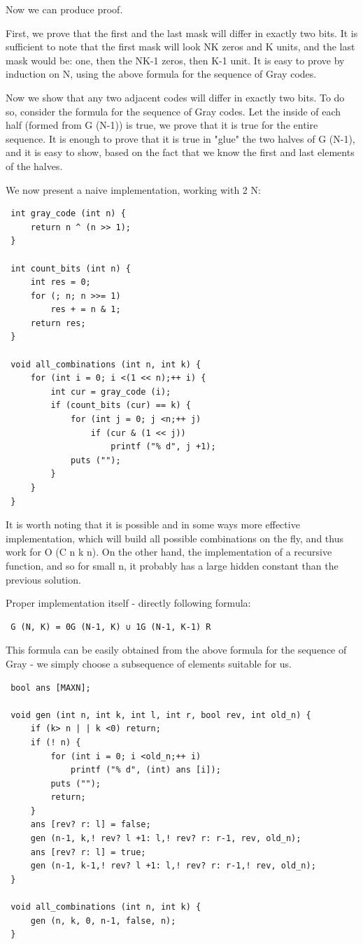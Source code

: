 Now we can produce proof.

First, we prove that the first and the last mask will differ in exactly two bits. It is sufficient to note that the first mask will look NK zeros and K units, and the last mask would be: one, then the NK-1 zeros, then K-1 unit. It is easy to prove by induction on N, using the above formula for the sequence of Gray codes.

Now we show that any two adjacent codes will differ in exactly two bits. To do so, consider the formula for the sequence of Gray codes. Let the inside of each half (formed from G (N-1)) is true, we prove that it is true for the entire sequence. It is enough to prove that it is true in "glue" the two halves of G (N-1), and it is easy to show, based on the fact that we know the first and last elements of the halves.

We now present a naive implementation, working with 2 N:

\begin{verbatim}
 int gray_code (int n) {
     return n ^ (n >> 1);
 }

 int count_bits (int n) {
     int res = 0;
     for (; n; n >>= 1)
         res + = n & 1;
     return res;
 }

 void all_combinations (int n, int k) {
     for (int i = 0; i <(1 << n);++ i) {
         int cur = gray_code (i);
         if (count_bits (cur) == k) {
             for (int j = 0; j <n;++ j)
                 if (cur & (1 << j))
                     printf ("% d", j +1);
             puts ("");
         }
     }
 } 
\end{verbatim}
It is worth noting that it is possible and in some ways more effective implementation, which will build all possible combinations on the fly, and thus work for O (C n k n). On the other hand, the implementation of a recursive function, and so for small n, it probably has a large hidden constant than the previous solution.

Proper implementation itself - directly following formula:

\begin{verbatim}
 G (N, K) = 0G (N-1, K) ∪ 1G (N-1, K-1) R 
\end{verbatim}
This formula can be easily obtained from the above formula for the sequence of Gray - we simply choose a subsequence of elements suitable for us.

\begin{verbatim}
 bool ans [MAXN];

 void gen (int n, int k, int l, int r, bool rev, int old_n) {
     if (k> n | | k <0) return;
     if (! n) {
         for (int i = 0; i <old_n;++ i)
             printf ("% d", (int) ans [i]);
         puts ("");
         return;
     }
     ans [rev? r: l] = false;
     gen (n-1, k,! rev? l +1: l,! rev? r: r-1, rev, old_n);
     ans [rev? r: l] = true;
     gen (n-1, k-1,! rev? l +1: l,! rev? r: r-1,! rev, old_n);
 }

 void all_combinations (int n, int k) {
     gen (n, k, 0, n-1, false, n);
 } 
\end{verbatim}

